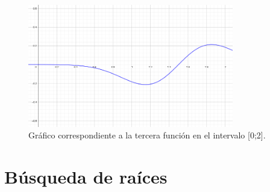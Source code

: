 \documentclass[titlepage,a4paper]{article}
\begin{document}
\begin{figure}[H]
\centering
\includegraphics[width=0.8\textwidth]{funcion3.png}
\caption{\label{fig:class01}Gráfico correspondiente a la tercera función en el intervalo [0;2].}
\end{figure}

\section{Búsqueda de raíces}\label{sec:busqueda_raices}
\end{document}
